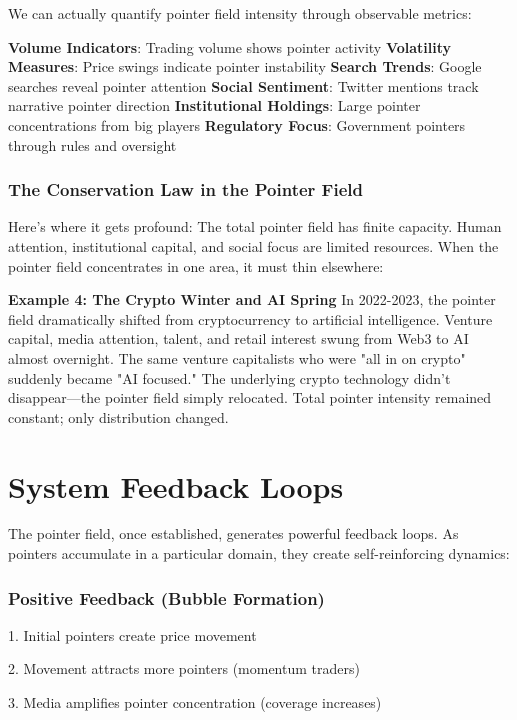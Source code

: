 \documentclass[11pt,oneside]{book}
\begin{document}
We can actually quantify pointer field intensity through observable metrics:

\textbf{Volume Indicators}: Trading volume shows pointer activity
\textbf{Volatility Measures}: Price swings indicate pointer instability
\textbf{Search Trends}: Google searches reveal pointer attention
\textbf{Social Sentiment}: Twitter mentions track narrative pointer direction
\textbf{Institutional Holdings}: Large pointer concentrations from big players
\textbf{Regulatory Focus}: Government pointers through rules and oversight

\subsubsection{The Conservation Law in the Pointer Field}

Here's where it gets profound: The total pointer field has finite capacity. Human attention, institutional capital, and social focus are limited resources. When the pointer field concentrates in one area, it must thin elsewhere:

\textbf{Example 4: The Crypto Winter and AI Spring}
In 2022-2023, the pointer field dramatically shifted from cryptocurrency to artificial intelligence. Venture capital, media attention, talent, and retail interest swung from Web3 to AI almost overnight. The same venture capitalists who were "all in on crypto" suddenly became "AI focused." The underlying crypto technology didn't disappear—the pointer field simply relocated. Total pointer intensity remained constant; only distribution changed.

\section{System Feedback Loops}

The pointer field, once established, generates powerful feedback loops. As pointers accumulate in a particular domain, they create self-reinforcing dynamics:

\subsubsection{Positive Feedback (Bubble Formation)}

1. Initial pointers create price movement


2. Movement attracts more pointers (momentum traders)


3. Media amplifies pointer concentration (coverage increases)
\end{document}
